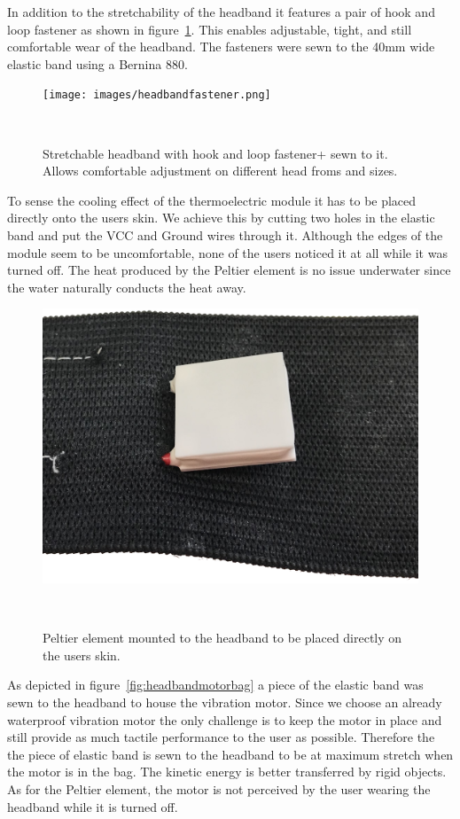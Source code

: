 In addition to the stretchability of the headband it features  a pair of hook and loop fastener as shown in figure~\ref{fig:headbandfastener}.
This enables adjustable, tight, and still comfortable wear of the headband.
The fasteners were sewn to the 40mm wide elastic band using a Bernina 880.

\begin{figure}
	\texttt{[image: images/headbandfastener.png]}
	\caption{Stretchable headband with hook and loop fastener+ sewn to it. Allows comfortable adjustment on different head froms and sizes.}~\label{fig:headbandfastener}
\end{figure}

To sense the cooling effect of the thermoelectric module it has to be placed directly onto the users skin.
We achieve this by cutting two holes in the elastic band and put the VCC and Ground wires through it. 
Although the edges of the module seem to be uncomfortable, none of the users noticed it at all while it was turned off.
The heat produced by the Peltier element is no issue underwater since the water naturally conducts the heat away.

\begin{figure}
	\includegraphics[width= \textwidth]{images/peltier.png}
	\caption{Peltier element mounted to the headband to be placed directly on the users skin.}~\label{fig:peltier}
\end{figure}

As depicted in figure~\ref{fig:headbandmotorbag} a piece of the elastic band was sewn to the headband to house the vibration motor.
Since we choose an already waterproof vibration motor the only challenge is to keep the motor in place and still provide as much tactile performance to the user as possible.
Therefore the the piece of elastic band is sewn to the headband to be at maximum stretch when the motor is in the bag.
The kinetic energy is better transferred by rigid objects.
As for the Peltier element, the motor is not perceived by the user wearing the headband while it is turned off.

